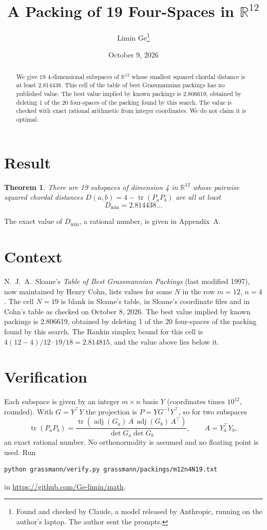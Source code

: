 \documentclass[11pt,a4paper]{article}
\title{A Packing of 19 Four-Spaces in $\mathbb{R}^{12}$}
\author{Limin Ge\thanks{Found and checked by Claude, a model released by Anthropic, running on the author's laptop. The author sent the prompts.}}
\date{October 9, 2026}
\newtheorem*{theorem}{Theorem}
\begin{document}
\maketitle
\begin{abstract}
We give 19 4-dimensional subspaces of $\mathbb{R}^{12}$ whose smallest squared chordal distance is at least 2.814438. This cell of the table of best Grassmannian packings has no published value. The best value implied by known packings is 2.806619, obtained by deleting 1 of the 20 four-spaces of the packing found by this search. The value is checked with exact rational arithmetic from integer coordinates. We do not claim it is optimal.
\end{abstract}

\section{Result}
\begin{theorem}
There are 19 subspaces of dimension 4 in $\mathbb{R}^{12}$ whose pairwise squared chordal distances $D(a,b) = 4 - \operatorname{tr}(P_aP_b)$ are all at least
\[ D_{\min} = 2.814438\ldots \]
\end{theorem}
The exact value of $D_{\min}$, a rational number, is given in Appendix~A.


\section{Context}
N.~J.~A.~Sloane's \emph{Table of Best Grassmannian Packings} (last modified 1997), now maintained by Henry Cohn, lists values for some $N$ in the row $m=12$, $n=4$. The cell $N=19$ is blank in Sloane's table, in Sloane's coordinate files and in Cohn's table as checked on October 8, 2026. The best value implied by known packings is 2.806619, obtained by deleting 1 of the 20 four-spaces of the packing found by this search. The Rankin simplex bound for this cell is $4(12-4)/12\cdot 19/18 = 2.814815$, and the value above lies below it.


\section{Verification}
Each subspace is given by an integer $m\times n$ basis $Y$ (coordinates times $10^{12}$, rounded). With $G=Y^\top Y$ the projection is $P=YG^{-1}Y^\top$, so for two subspaces
\[ \operatorname{tr}(P_aP_b)=\frac{\operatorname{tr}(\operatorname{adj}(G_a)\,A\,\operatorname{adj}(G_b)\,A^\top)}{\det G_a\det G_b},\qquad A=Y_a^\top Y_b, \]
an exact rational number. No orthonormality is assumed and no floating point is used. Run
\begin{verbatim}
python grassmann/verify.py grassmann/packings/m12n4N19.txt
\end{verbatim}
in \url{https://github.com/Ge-limin/math}.
\end{document}

